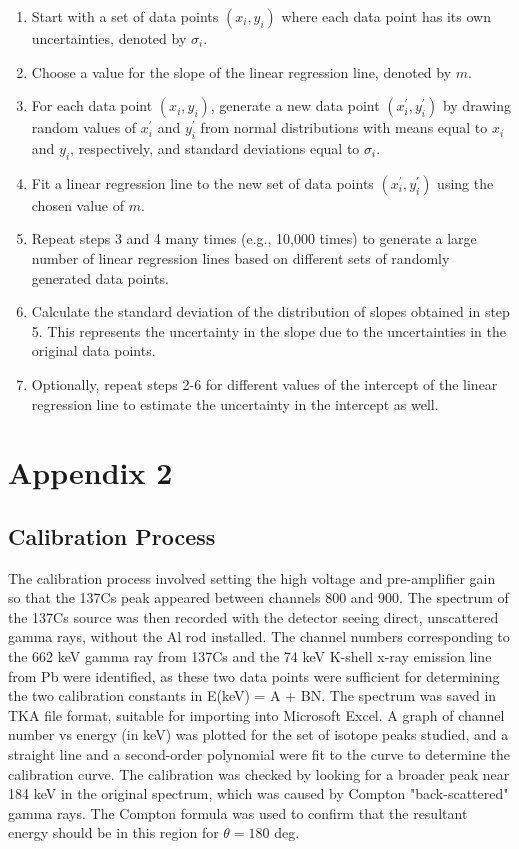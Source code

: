 \begin{enumerate}
\item Start with a set of data points $(x_i,y_i)$ where each data point has its own uncertainties, denoted by $\sigma_i$.
\item Choose a value for the slope of the linear regression line, denoted by $m$.
\item For each data point $(x_i,y_i)$, generate a new data point $(x_i^\prime,y_i^\prime)$ by drawing random values of $x_i^\prime$ and $y_i^\prime$ from normal distributions with means equal to $x_i$ and $y_i$, respectively, and standard deviations equal to $\sigma_i$.
\item Fit a linear regression line to the new set of data points $(x_i^\prime,y_i^\prime)$ using the chosen value of $m$.
\item Repeat steps 3 and 4 many times (e.g., 10,000 times) to generate a large number of linear regression lines based on different sets of randomly generated data points.
\item Calculate the standard deviation of the distribution of slopes obtained in step 5. This represents the uncertainty in the slope due to the uncertainties in the original data points.
\item Optionally, repeat steps 2-6 for different values of the intercept of the linear regression line to estimate the uncertainty in the intercept as well.
\end{enumerate}


\section*{Appendix 2}

\subsection{Calibration Process}

The calibration process involved setting the high voltage and pre-amplifier gain so that the 137Cs peak appeared between channels 800 and 900. The spectrum of the 137Cs source was then recorded with the detector seeing direct, unscattered gamma rays, without the Al rod installed. The channel numbers corresponding to the 662 keV gamma ray from 137Cs and the 74 keV K-shell x-ray emission line from Pb were identified, as these two data points were sufficient for determining the two calibration constants in E(keV) = A + BN. The spectrum was saved in TKA file format, suitable for importing into Microsoft Excel. A graph of channel number vs energy (in keV) was plotted for the set of isotope peaks studied, and a straight line and a second-order polynomial were fit to the curve to determine the calibration curve. The calibration was checked by looking for a broader peak near 184 keV in the original spectrum, which was caused by Compton "back-scattered" gamma rays. The Compton formula was used to confirm that the resultant energy should be in this region for $\theta=180$ deg. 

